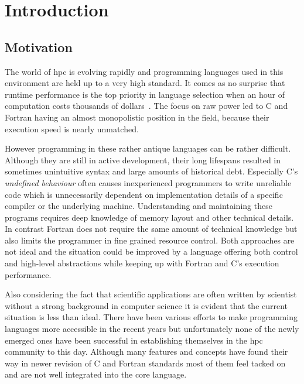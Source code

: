 \chapter{Introduction}
\label{ch:Introduction}


\section{Motivation}
\label{sec:Introduction::Motivation}

The world of \gls{hpc} is evolving rapidly and programming languages used in this environment are held up to a very high standard. It comes as no surprise that runtime performance is the top priority in language selection when an hour of computation costs thousands of dollars~\cite{cost_of_science}. The focus on raw power led to C and Fortran having an almost monopolistic position in the field, because their execution speed is nearly unmatched.

However programming in these rather antique languages can be rather difficult. Although they are still in active development, their long lifespans resulted in sometimes unintuitive syntax and large amounts of historical debt. Especially C's \textit{undefined behaviour} often causes inexperienced programmers to write unreliable code which is unnecessarily dependent on implementation details of a specific compiler or the underlying machine. Understanding and maintaining these programs requires deep knowledge of memory layout and other technical details. In contrast Fortran does not require the same amount of technical knowledge but also limits the programmer in fine grained resource control. Both approaches are not ideal and the situation could be improved by a language offering both control and high-level abstractions while keeping up with Fortran and C's execution performance.

Also considering the fact that scientific applications are often written by scientist without a strong background in computer science it is evident that the current situation is less than ideal. There have been various efforts to make programming languages more accessible in the recent years but unfortunately none of the newly emerged ones have been successful in establishing themselves in the \gls{hpc} community to this day. Although many features and concepts have found their way in newer revision of C and Fortran standards most of them feel tacked on and are not well integrated into the core language.

